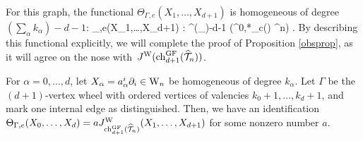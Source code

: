 \documentclass[10pt]{amsart}
\begin{document}
%
%
%
For this graph, the functional $\Theta_{\Gamma,e}(X_1,\ldots,X_{d+1})$ is homogeneous of degree $\left(\sum_\alpha {k_\alpha}\right)-d-1$:
\ben
\Theta_{\Gamma,e}(X_1,\ldots,X_{d+1}) : \Sym^{\left(\sum_\right)-d-1} (\Omega^{0,*}_c(\CC) \tensor \CC^n) \to \CC .
\een
By describing this functional explicitly, 
we will complete the proof of Proposition \ref{obsprop},
as it will agree on the nose with~$J^{\rm W}({\rm ch}_{d+1}^{{\rm GF}}(\widehat{\mathcal T}_n))$.

%
%

\begin{lem}
For $\alpha=0,\ldots,d$, let $X_\alpha = a^i_\alpha \partial_i \in {{\rm W}_n}$ be homogeneous of degree $k_\alpha$. 
Let $\Gamma$ be the $(d+1)$-vertex wheel with ordered vertices of valencies $k_0+1, \ldots, k_{d} + 1$, and mark one internal edge as distinguished.
Then, we have an identification $\Theta_{\Gamma,e}(X_0,\ldots,X_{d}) = a J^{\rm W}_{{\rm ch}_{d+1}^{\rm GF} (\widehat{\mathcal T}_n)}(X_1,\ldots,X_{d+1})$ for some nonzero number $a$. 
\end{lem}
 
\end{document}
